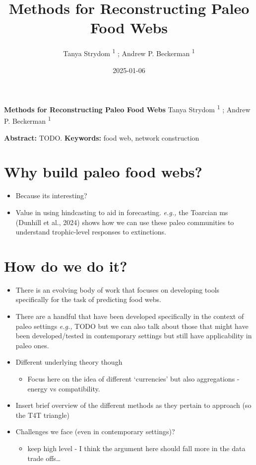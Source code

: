 \documentclass[
]{article}
\title{Methods for Reconstructing Paleo Food Webs}
\author{Tanya Strydom %
%
\textsuperscript{%
%
1%
}%
; Andrew P. Beckerman %
%
\textsuperscript{%
%
1%
}%
}
\date{2025-01-06}
\providecommand{\tightlist}{%
  \setlength{\itemsep}{0pt}\setlength{\parskip}{0pt}}\usepackage{longtable,booktabs,array}
\begin{document}
\thispagestyle{empty}
{\bfseries\sffamily\Large Methods for Reconstructing Paleo Food Webs}
\vfil
Tanya Strydom %
%
\textsuperscript{%
%
1%
}%
; Andrew P. Beckerman %
%
\textsuperscript{%
%
1%
}%

\vfil
{\small
\textbf{Abstract:} TODO.
\vfil
\textbf{Keywords:} %
food web, %
network construction%
}
\clearpage
\setcounter{page}{1}
\doublespacing
\linenumbers


\section{Why build paleo food webs?}\label{why-build-paleo-food-webs}

\begin{itemize}
\item
  Because its interesting?
\item
  Value in using hindcasting to aid in forecasting. \emph{e.g.,} the
  Toarcian ms (Dunhill et al., 2024) shows how we can use these paleo
  communities to understand trophic-level responses to extinctions.
\end{itemize}

\section{How do we do it?}\label{how-do-we-do-it}

\begin{itemize}
\item
  There is an evolving body of work that focuses on developing tools
  specifically for the task of predicting food webs.
\item
  There are a handful that have been developed specifically in the
  context of paleo settings \emph{e.g.,} TODO but we can also talk about
  those that might have been developed/tested in contemporary settings
  but still have applicability in paleo ones.
\item
  Different underlying theory though

  \begin{itemize}
  \tightlist
  \item
    Focus here on the idea of different `currencies' but also
    aggregations - energy vs compatibility.
  \end{itemize}
\item
  Insert brief overview of the different methods as they pertain to
  approach (so the T4T triangle)
\item
  Challenges we face (even in contemporary settings)?

  \begin{itemize}
  \tightlist
  \item
    keep high level - I think the argument here should fall more in the
    data trade offs\ldots{}
  \end{itemize}
\end{itemize}
\end{document}
